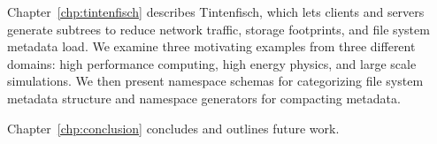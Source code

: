 Chapter~\ref{chp:tintenfisch} describes Tintenfisch, which lets clients and
servers generate subtrees to reduce network traffic, storage footprints, and
file system metadata load. We examine three motivating examples from three
different domains: high performance computing, high energy physics, and large
scale simulations. We then present namespace schemas for categorizing file
system metadata structure and namespace generators for compacting metadata.

Chapter~\ref{chp:conclusion} concludes and outlines future work.


